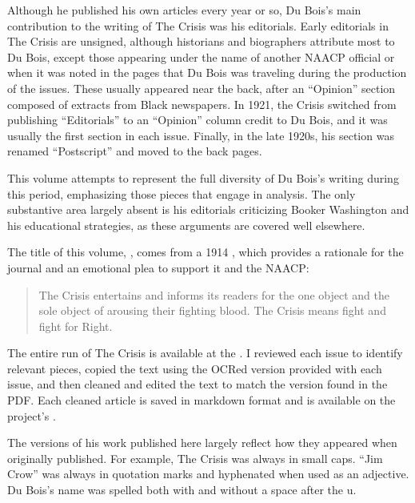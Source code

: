\documentclass[letterpaper,10pt,english]{jupyterBook}
\begin{document}
\sphinxAtStartPar
Although he published his own articles every year or so, Du Bois’s main contribution to the writing of The Crisis was his editorials. Early editorials in The Crisis are unsigned, although historians and biographers attribute most to Du Bois, except those appearing under the name of another NAACP official or when it was noted in the pages that Du Bois was traveling during the production of the issues. These usually appeared near the back, after an “Opinion” section composed of extracts from Black newspapers. In 1921, the Crisis switched from publishing “Editorials” to an “Opinion” column credit to Du Bois, and it was usually the first section in each issue. Finally, in the late 1920s, his section was renamed “Postscript” and moved to the back pages.

\sphinxAtStartPar
This volume attempts to represent the full diversity of Du Bois’s writing during this period, emphasizing those pieces that engage in analysis. The only substantive area largely absent is his editorials criticizing Booker Washington and his educational strategies, as these arguments are covered well elsewhere.

\sphinxAtStartPar
The title of this volume, , comes from a 1914 {\hyperref[\detokenize{Volumes/07/03/fightordie::doc}]{}}, which provides a rationale for the journal and an emotional plea to support it and the NAACP:
\begin{quote}

\sphinxAtStartPar
The Crisis entertains and informs its readers for the one object and the sole object of arousing their fighting blood. The Crisis means fight and fight for Right.
\end{quote}

\sphinxAtStartPar
The entire run of The Crisis is available at the . I reviewed each issue to identify relevant pieces, copied the text using the OCRed version provided with each issue, and then cleaned and edited the text to match the version found in the PDF. Each cleaned article is saved in markdown format and is available on the project’s .

\sphinxAtStartPar
The versions of his work published here largely reflect how they appeared when originally published. For example, The Crisis  was always in small caps. “Jim Crow” was always in quotation marks and hyphenated when used as an adjective. Du Bois’s name was spelled both with and without a space after the u.
\end{document}
